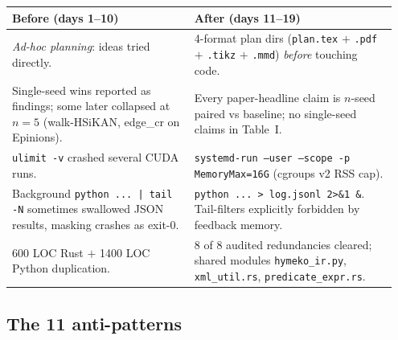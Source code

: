 \documentclass[11pt,a4paper]{article}
\theoremstyle{plain}
\theoremstyle{definition}
\newcommand{\code}[1]{\texttt{\small #1}}
\begin{document}
\begin{center}\small
\begin{tabular}{p{0.45\linewidth} p{0.50\linewidth}}
\toprule
Before (days 1–10) & After (days 11–19) \\
\midrule
\emph{Ad-hoc planning}: ideas tried directly. & 4-format plan dirs
(\code{plan.tex} $+$ \code{.pdf} $+$ \code{.tikz} $+$ \code{.mmd})
\emph{before} touching code. \\
Single-seed wins reported as findings; some later collapsed at
$n{=}5$ (walk-HSiKAN, edge\_cr on Epinions).
& Every paper-headline claim is $n$-seed paired vs baseline; no
single-seed claims in Table~I. \\
\code{ulimit -v} crashed several CUDA runs. & \code{systemd-run
--user --scope -p MemoryMax=16G} (cgroups v2 RSS cap). \\
Background \code{python ... | tail -N} sometimes swallowed JSON
results, masking crashes as exit-0.
& \code{python ... > log.jsonl 2>\&1 \&}. Tail-filters explicitly
forbidden by feedback memory. \\
600 LOC Rust $+$ 1400 LOC Python duplication. & 8 of 8 audited
redundancies cleared; shared modules \code{hymeko\_ir.py},
\code{xml\_util.rs}, \code{predicate\_expr.rs}. \\
\bottomrule
\end{tabular}
\end{center}

\subsection{The 11 anti-patterns}
\end{document}
